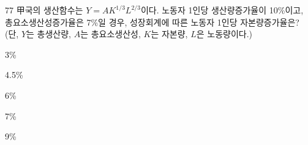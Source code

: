 \begin{question}{77}
甲국의 생산함수는 $Y=AK^{1/3}L^{2/3}$이다. 노동자 1인당 생산량증가율이 10\%이고, 총요소생산성증가율은 7\%일 경우, 성장회계에 따른 노동자 1인당 자본량증가율은? (단, $Y$는 총생산량, $A$는 총요소생산성, $K$는 자본량, $L$은 노동량이다.)
\begin{choices}
  \item 3\%
  \item 4.5\%
  \item 6\%
  \item 7\%
  \item 9\%
\end{choices}
\end{question}

